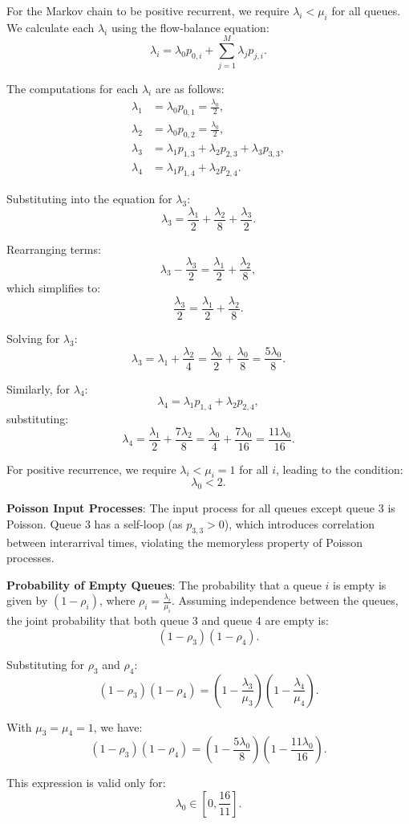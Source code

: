 \begin{solution}
    For the Markov chain to be positive recurrent, we require $\lambda_i < \mu_i$ for all queues. We calculate each $\lambda_i$ using the flow-balance equation:
    \[
        \lambda_i = \lambda_0 p_{0,i} + \sum_{j=1}^M \lambda_j p_{j,i}.
    \]

    The computations for each $\lambda_i$ are as follows:
    \begin{align*}
        \lambda_1 & = \lambda_0 p_{0,1} = \frac{\lambda_0}{2}, \\
        \lambda_2 & = \lambda_0 p_{0,2} = \frac{\lambda_0}{2}, \\
        \lambda_3 & = \lambda_1 p_{1,3} + \lambda_2 p_{2,3} + \lambda_3 p_{3,3}, \\
        \lambda_4 & = \lambda_1 p_{1,4} + \lambda_2 p_{2,4}.
    \end{align*}

    Substituting into the equation for $\lambda_3$:
    \[
        \lambda_3 = \frac{\lambda_1}{2} + \frac{\lambda_2}{8} + \frac{\lambda_3}{2}.
    \]

    Rearranging terms:
    \[
        \lambda_3 - \frac{\lambda_3}{2} = \frac{\lambda_1}{2} + \frac{\lambda_2}{8},
    \]
    which simplifies to:
    \[
        \frac{\lambda_3}{2} = \frac{\lambda_1}{2} + \frac{\lambda_2}{8}.
    \]

    Solving for $\lambda_3$:
    \[
        \lambda_3 = \lambda_1 + \frac{\lambda_2}{4} = \frac{\lambda_0}{2} + \frac{\lambda_0}{8} = \frac{5\lambda_0}{8}.
    \]

    Similarly, for $\lambda_4$:
    \[
        \lambda_4 = \lambda_1 p_{1,4} + \lambda_2 p_{2,4},
    \]
    substituting:
    \[
        \lambda_4 = \frac{\lambda_1}{2} + \frac{7\lambda_2}{8} = \frac{\lambda_0}{4} + \frac{7\lambda_0}{16} = \frac{11\lambda_0}{16}.
    \]

    For positive recurrence, we require $\lambda_i < \mu_i = 1$ for all $i$, leading to the condition:
    \[
        \lambda_0 < 2.
    \]

    \textbf{Poisson Input Processes}: The input process for all queues except queue 3 is Poisson. Queue 3 has a self-loop (as $p_{3,3} > 0$), which introduces correlation between interarrival times, violating the memoryless property of Poisson processes.

    \textbf{Probability of Empty Queues}: The probability that a queue $i$ is empty is given by $(1 - \rho_i)$, where $\rho_i = \frac{\lambda_i}{\mu_i}$. Assuming independence between the queues, the joint probability that both queue 3 and queue 4 are empty is:
    \[
        (1 - \rho_3)(1 - \rho_4).
    \]

    Substituting for $\rho_3$ and $\rho_4$:
    \[
        (1 - \rho_3)(1 - \rho_4) = \left(1 - \frac{\lambda_3}{\mu_3}\right) \left(1 - \frac{\lambda_4}{\mu_4}\right).
    \]

    With $\mu_3 = \mu_4 = 1$, we have:
    \[
        (1 - \rho_3)(1 - \rho_4) = \left(1 - \frac{5\lambda_0}{8}\right) \left(1 - \frac{11\lambda_0}{16}\right).
    \]

    This expression is valid only for:
    \[
        \lambda_0 \in [0, \frac{16}{11}].
    \]
\end{solution}

